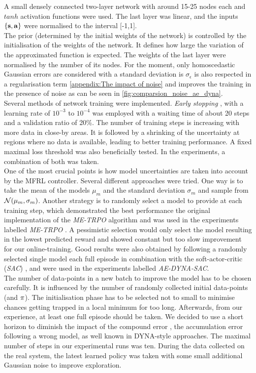 \documentclass[
reprint,
amsmath,amssymb,amsfonts,clevref,
aps,
prstab,
]{revtex4-2}
\begin{document}
A small densely connected two-layer network with around 15-25 nodes each and $tanh$ activation functions were used. The last layer was linear, and the inputs $\{\mathbf{s},\mathbf{a}\}$ were normalised to the interval [-1,1].\\
The prior (determined by the initial weights of the network) is controlled by the initialisation of the weights of the network. It defines how large the variation of the approximated function is expected. The weights of the last layer were normalised by the number of its nodes. For the moment, only homoscedastic Gaussian errors are considered with a standard deviation is $\sigma_\epsilon$ is also respected in a regularisation term \cref{appendix:The impact of noise} and improves the training in the presence of noise as can be seen in \cref{fig:comparsion_noise_ae_dyna}. \\
Several methods of network training were implemented. \emph{Early stopping} \cite{Goodfellow2016}, with a learning rate of $10^{-3}$ to $10^{-4}$  was employed  with a waiting time of about 20 steps and a validation ratio of 20\%. The number of training steps is increasing with more data in close-by areas. It is followed by a shrinking of the uncertainty at regions where no data is available, leading to better training performance. A fixed maximal loss threshold was also beneficially tested. In the experiments, a combination of both was taken.\\
One of the most crucial points is how model uncertainties are taken into account by the MFRL controller. Several different approaches were tried. One way is to take the mean of the models $\mu_m$ and the standard deviation $\sigma_m$ and sample from $\mathcal{N}(\mu_m,\sigma_m)$. Another strategy is to randomly select a model to provide at each training step, which demonstrated the best performance the original implementation of the \emph{ME-TRPO} algorithm and was used in the experiments labelled \emph{ME-TRPO} \cite{Kurutach2018}. A pessimistic selection would only select the model resulting in the lowest predicted reward and showed constant but too slow improvement for our online-training.
Good results were also obtained by following a randomly selected single model each full episode in combination with the soft-actor-critic (\emph{SAC}) \cite{fujimoto2018addressing,Hill2018}, and were used in the experiments labelled \emph{AE-DYNA-SAC}. \\
The number of data-points in a new batch to improve the model has to be chosen carefully. It is influenced by the number of randomly collected initial data-points (and $\pi$). The initialisation phase has to be selected not to small to minimise chances getting trapped in a local minimum for too long. Afterwards, from our experience, at least one full episode should be taken. We decided to use a short horizon to diminish the impact of the compound error \cite{Janner2019}, the accumulation error following a wrong model, as well known in DYNA-style approaches. The maximal number of steps in our experimental runs was ten. During the data collected on the real system, the latest learned policy was taken with some small additional Gaussian noise to improve exploration.\\
\end{document}
